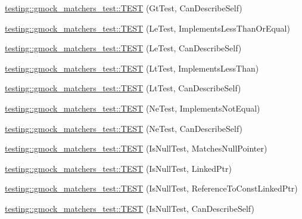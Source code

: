 \begin{DoxyCompactItemize}
\item 
\mbox{\hyperlink{namespacetesting_1_1gmock__matchers__test_a2981bbdbf9cbd8864a6dde4ff4b06050}{testing\+::gmock\+\_\+matchers\+\_\+test\+::\+T\+E\+ST}} (Gt\+Test, Can\+Describe\+Self)
\item 
\mbox{\hyperlink{namespacetesting_1_1gmock__matchers__test_af0cd1cfc3ff1272bfe06f31c5eb3ab8b}{testing\+::gmock\+\_\+matchers\+\_\+test\+::\+T\+E\+ST}} (Le\+Test, Implements\+Less\+Than\+Or\+Equal)
\item 
\mbox{\hyperlink{namespacetesting_1_1gmock__matchers__test_a463bc4f6cdca489c05ad691e1254e2f3}{testing\+::gmock\+\_\+matchers\+\_\+test\+::\+T\+E\+ST}} (Le\+Test, Can\+Describe\+Self)
\item 
\mbox{\hyperlink{namespacetesting_1_1gmock__matchers__test_a9f332401730e637d5c3923924dc339e3}{testing\+::gmock\+\_\+matchers\+\_\+test\+::\+T\+E\+ST}} (Lt\+Test, Implements\+Less\+Than)
\item 
\mbox{\hyperlink{namespacetesting_1_1gmock__matchers__test_ae29bb32c74970fc22e7ac5d86e7e6c26}{testing\+::gmock\+\_\+matchers\+\_\+test\+::\+T\+E\+ST}} (Lt\+Test, Can\+Describe\+Self)
\item 
\mbox{\hyperlink{namespacetesting_1_1gmock__matchers__test_a7319f919e57cf349f733bbdb56177daf}{testing\+::gmock\+\_\+matchers\+\_\+test\+::\+T\+E\+ST}} (Ne\+Test, Implements\+Not\+Equal)
\item 
\mbox{\hyperlink{namespacetesting_1_1gmock__matchers__test_a8a743510a5256803d75c2d7735ec515a}{testing\+::gmock\+\_\+matchers\+\_\+test\+::\+T\+E\+ST}} (Ne\+Test, Can\+Describe\+Self)
\item 
\mbox{\hyperlink{namespacetesting_1_1gmock__matchers__test_ae1c2971c161e051bf52b86b62c51bb95}{testing\+::gmock\+\_\+matchers\+\_\+test\+::\+T\+E\+ST}} (Is\+Null\+Test, Matches\+Null\+Pointer)
\item 
\mbox{\hyperlink{namespacetesting_1_1gmock__matchers__test_a0b1655e1640b7da6e1e7cc35074d9274}{testing\+::gmock\+\_\+matchers\+\_\+test\+::\+T\+E\+ST}} (Is\+Null\+Test, Linked\+Ptr)
\item 
\mbox{\hyperlink{namespacetesting_1_1gmock__matchers__test_afaaf0776096c0ad62de8236ab1b774d7}{testing\+::gmock\+\_\+matchers\+\_\+test\+::\+T\+E\+ST}} (Is\+Null\+Test, Reference\+To\+Const\+Linked\+Ptr)
\item 
\mbox{\hyperlink{namespacetesting_1_1gmock__matchers__test_a5ba91e0b79fcc0b17b1c1e373e741c38}{testing\+::gmock\+\_\+matchers\+\_\+test\+::\+T\+E\+ST}} (Is\+Null\+Test, Can\+Describe\+Self)
\item 

\end{DoxyCompactItemize}
